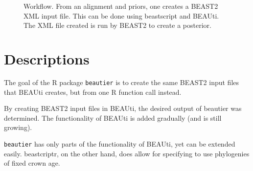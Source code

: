 \documentclass{article}
\begin{document}
\begin{figure}

  \caption{
    Workflow. From an alignment and priors, one creates a BEAST2 XML input file. This
    can be done using beastscript and BEAUti. The XML file created is run by BEAST2
    to create a posterior.
  }
  \label{fig:workflow}
\end{figure}

\section{Descriptions}

The goal of the R package \verb;beautier; is to create the 
same BEAST2 input files that BEAUti creates, but from one R function call 
instead.

By creating BEAST2 input files in BEAUti, 
the desired output of beautier was determined. 
The functionality of BEAUti is added gradually (and is still growing).

\verb;beautier; has only parts of the functionality of BEAUti, yet
can be extended easily. beastcriptr, on the other hand, does allow for specifying
to use phylogenies of fixed crown age.
\end{document}
